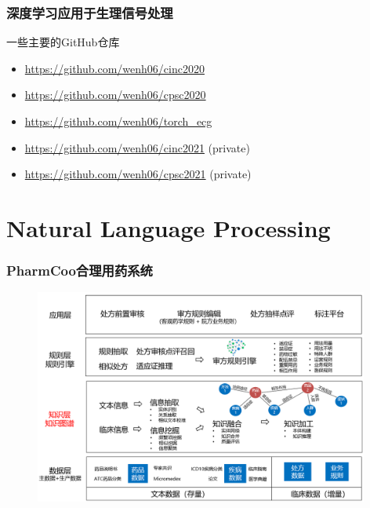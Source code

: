 \begin{frame}
\frametitle{深度学习应用于生理信号处理}

一些主要的GitHub仓库

\vspace{1.2em}

\begin{itemize}
\item \href{https://github.com/wenh06/cinc2020}{https://github.com/wenh06/cinc2020}
\vspace{0.8em}
\item \href{https://github.com/wenh06/cpsc2020}{https://github.com/wenh06/cpsc2020}
\vspace{0.8em}
\item \href{https://github.com/wenh06/torch_ecg}{https://github.com/wenh06/torch\_ecg}
\vspace{0.8em}
\item \href{https://github.com/wenh06/cinc2021}{https://github.com/wenh06/cinc2021} (private)
\vspace{0.8em}
\item \href{https://github.com/wenh06/cpsc2021}{https://github.com/wenh06/cpsc2021} (private)
\end{itemize}

\end{frame}


\section[NLP]{Natural Language Processing}


\begin{frame}
\frametitle{PharmCoo合理用药系统}

\begin{figure}
\centering
\includegraphics[width=0.98\textwidth,keepaspectratio]{images/pharmcoo.png}
\end{figure}

\end{frame}

